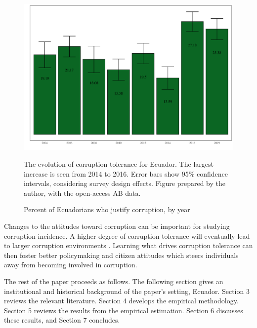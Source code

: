 \documentclass[12pt,a4]{article}
\makeatletter
\def\maxwidth{ %
  \ifdim\Gin@nat@width>\linewidth
    \linewidth
  \else
    \Gin@nat@width
  \fi
}
\newenvironment{knitrout}{}{} %
\makeatother
\begin{document}

\begin{figure}[htbp]
\label{fig:ctoly}
\caption{Percent of Ecuadorians who justify corruption, by year}
\begin{knitrout}
\color{fgcolor}

{\centering \includegraphics[width=\maxwidth]{figure/ctol_graph-1} 

}


\end{knitrout}


The evolution of corruption tolerance for Ecuador. The largest increase is seen from 2014 to 2016. Error bars show 95\% confidence intervals, considering survey design effects. Figure prepared by the author, with the open-access AB data.
\end{figure}

Changes to the attitudes toward corruption can be important for studying corruption incidence. A higher degree of corruption tolerance will eventually lead to larger corruption environments \parencite{Campbell.2014}. Learning what drives corruption tolerance can then foster better policymaking and citizen attitudes which steers individuals away from becoming involved in corruption.

The rest of the paper proceeds as follows. The following section gives an institutional and historical background of the paper's setting, Ecuador. Section 3 reviews the relevant literature. Section 4 develops the empirical methodology. Section 5 reviews the results from the empirical estimation. Section 6 discusses these results, and Section 7 concludes. 
\end{document}

